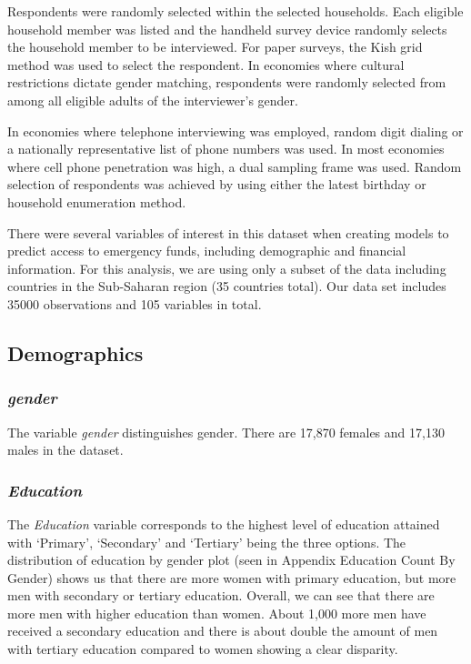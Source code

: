 \documentclass[water,article,submit,moreauthors,pdftex]{mdpi}
\begin{document}
Respondents were randomly selected within the selected households. Each
eligible household member was listed and the handheld survey device
randomly selects the household member to be interviewed. For paper
surveys, the Kish grid method was used to select the respondent. In
economies where cultural restrictions dictate gender matching,
respondents were randomly selected from among all eligible adults of the
interviewer's gender.

In economies where telephone interviewing was employed, random digit
dialing or a nationally representative list of phone numbers was used.
In most economies where cell phone penetration was high, a dual sampling
frame was used. Random selection of respondents was achieved by using
either the latest birthday or household enumeration method.

There were several variables of interest in this dataset when creating
models to predict access to emergency funds, including demographic and
financial information. For this analysis, we are using only a subset of
the data including countries in the Sub-Saharan region (35 countries
total). Our data set includes 35000 observations and 105 variables in
total.

\hypertarget{demographics}{%
\subsection{Demographics}\label{demographics}}

\hypertarget{gender}{%
\subsubsection{\texorpdfstring{\emph{gender}}{gender}}\label{gender}}

The variable \emph{gender} distinguishes gender. There are 17,870
females and 17,130 males in the dataset.

\hypertarget{education}{%
\subsubsection{\texorpdfstring{\emph{Education}}{Education}}\label{education}}

The \emph{Education} variable corresponds to the highest level of
education attained with `Primary', `Secondary' and `Tertiary' being the
three options. The distribution of education by gender plot (seen in
Appendix Education Count By Gender) shows us that there are more women
with primary education, but more men with secondary or tertiary
education. Overall, we can see that there are more men with higher
education than women. About 1,000 more men have received a secondary
education and there is about double the amount of men with tertiary
education compared to women showing a clear disparity.
\end{document}
